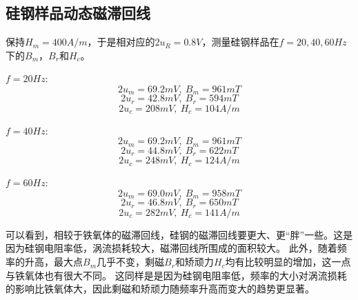 \documentclass{article}
\begin{document}
    \subsection{硅钢样品动态磁滞回线}
    保持$H_m=400A/m$，于是相对应的$2u_R=0.8V$，测量硅钢样品在$f=20,40,60Hz$下的$B_m$，$B_r$和$H_c$。

    $f=20Hz:$
    $$2u_m=69.2mV,\ B_m=961mT$$
    $$2u_r=42.8mV,\ B_r=594mT$$
    $$2u_c=208mV,\ H_c=104A/m$$

    $f=40Hz:$
    $$2u_m=69.2mV,\ B_m=961mT$$
    $$2u_r=44.8mV,\ B_r=622mT$$
    $$2u_c=248mV,\ H_c=124A/m$$

    $f=60Hz:$
    $$2u_m=69.0mV,\ B_m=958mT$$
    $$2u_r=46.8mV,\ B_r=650mT$$
    $$2u_c=282mV,\ H_c=141A/m$$

    可以看到，相较于铁氧体的磁滞回线，硅钢的磁滞回线要更大、更“胖”一些。这是因为硅钢电阻率低，涡流损耗较大，磁滞回线所围成的面积较大。
    此外，随着频率的升高，最大点$B_m$几乎不变，剩磁$B_r$和矫顽力$H_c$均有比较明显的增加，这一点与铁氧体也有很大不同。
    这同样是是因为硅钢电阻率低，频率的大小对涡流损耗的影响比铁氧体大，因此剩磁和矫顽力随频率升高而变大的趋势更显著。
\end{document}
